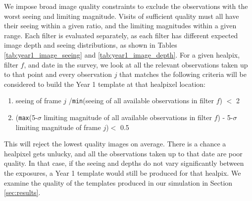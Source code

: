 \documentclass[preprintm,linenumbers]{aastex631}
\newcommand{\baseline}{\texttt{one\_snap\_v4.0}\xspace}
\begin{document}
	We impose broad image quality constraints to exclude the observations with the worst seeing and limiting magnitude. 
    Visits of sufficient quality must all have their seeing within a given ratio, and the limiting magnitudes within a given range.
 Each filter is evaluated separately, as each filter has different expected image depth and seeing distributions, as shown in Tables \ref{tab:year1_image_seeing} and  \ref{tab:year1_image_depth}. 
	For a given healpix, filter $f$, and date in the survey, we look at all the relevant observations taken up to that point and  every observation $j$ that matches the following criteria will be considered to build the Year 1 template at that healpixel location: 
	\begin{enumerate}
		\item seeing of frame $j$ /\texttt{min}(seeing of all available observations in filter $f$) $<$ 2
		\item (\texttt{max}(5-$\sigma$ limiting magnitude of all available observations in filter $f$) -  5-$\sigma$ limiting magnitude of frame $j$)$<$ 0.5
	\end{enumerate}
	This will reject the lowest quality images on average. There is a chance a healpixel gets unlucky, and all the observations taken up to that date are poor quality. In that case, if the seeing and depths do not vary significantly between the exposures, a Year 1 template would still be produced for that healpix. We examine the quality of the templates produced in our simulation in Section \ref{sec:results}.
	
	
	\begin{table}
		\centering
		
		\caption{
			Observation seeing statistics for the ``effective" \gls*{fwhm} seeing: median, standard deviation (std), minimum, and maximum.
   Results are given per filter for Year 1 of the \baseline cadence simulation (excluding low-solar elongation twilight survey and \gls*{ddf} visits).
		}
		\label{tab:year1_image_seeing}
	\end{table}
	
	\begin{table}
		\centering
		
		\caption{
			Observation 5-$\sigma$ limiting magnitude (image depth) statistics: median, standard deviation, minimum, and maximum.
   Results are given per filter for Year 1 of the \baseline cadence simulation (excluding low-solar elongation twilight survey and \gls*{ddf} visits).
		}
		\label{tab:year1_image_depth}
	\end{table}
	
\end{document}
